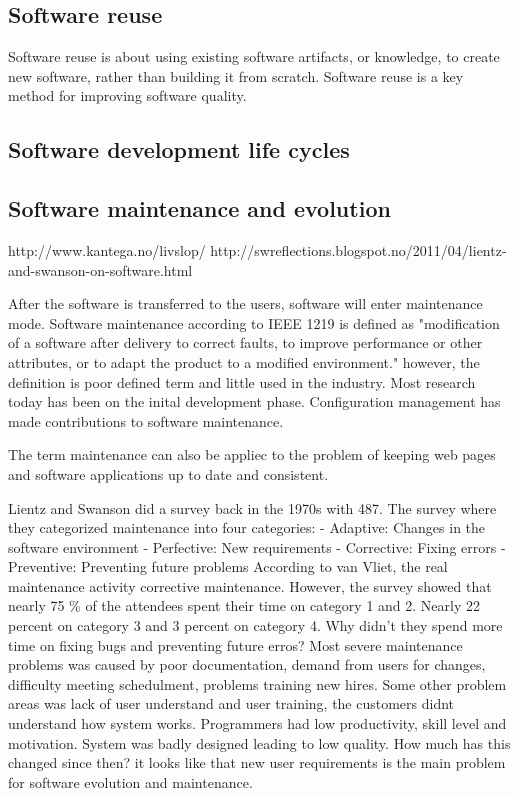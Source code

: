 \subsection{Software reuse}
Software reuse is about using existing software artifacts, or knowledge, to create new software, rather than building it from scratch. Software reuse is a key method for improving software quality. 


\subsection{Software development life cycles} %






\subsection{Software maintenance and evolution}
http://www.kantega.no/livslop/
http://swreflections.blogspot.no/2011/04/lientz-and-swanson-on-software.html

After the software is transferred to the users, software will enter maintenance mode. Software maintenance according to IEEE 1219 is defined as "modification of a software after delivery to correct faults, to improve performance or other attributes, or to adapt the product to a modified environment." however, the definition is poor defined term and little used in the industry. Most research today has been on the inital development phase. Configuration management has made contributions to software maintenance. 

The term maintenance can also be appliec to the problem of keeping web pages and software applications up to date and consistent.

Lientz and Swanson did a survey back in the 1970s with 487. The survey where they categorized maintenance into four categories:
- Adaptive: Changes in the software environment
- Perfective: New requirements
- Corrective: Fixing errors
- Preventive: Preventing future problems
According to van Vliet, the real maintenance activity corrective maintenance. However, the survey showed that nearly 75 \% of the attendees spent their time on category 1 and 2. Nearly 22 percent on category 3 and 3 percent on category 4. Why didn't they spend more time on fixing bugs and preventing future erros? Most severe maintenance problems was caused by poor documentation, demand from users for changes, difficulty meeting schedulment, problems training new hires.  Some other problem areas was lack of user understand and user training, the customers didnt understand how system works. Programmers had low productivity, skill level and motivation. System was badly designed leading to low quality. How much has this changed since then? it looks like that new user requirements is the main problem for software evolution and maintenance.

